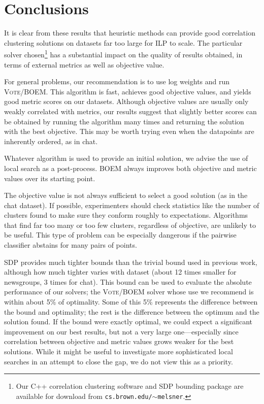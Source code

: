 \documentclass[11pt]{article}
\newcommand{\cut}[1]{}
\newcommand{\alg}[1]{\textsc{#1}}
\begin{document}
\section{Conclusions}

It is clear from these results that heuristic methods can provide good
correlation clustering solutions on datasets far too large for ILP to
scale. The particular solver chosen\footnote{Our C++ correlation
  clustering software and SDP bounding package are available for
  download from \texttt{cs.brown.edu/$\sim$melsner}.} has a
substantial impact on the quality of results obtained, in terms of
external metrics as well as objective value.

For general problems, our recommendation is to use log weights and run
\alg{Vote}/\alg{BOEM}. This algorithm is fast, achieves good objective values,
and yields good metric scores on our datasets. Although objective
values are usually only weakly correlated with metrics, our results
suggest that slightly better scores can be obtained by running the
algorithm many times and returning the solution with the best
objective. This may be worth trying even when the datapoints
are inherently ordered, as in chat.

Whatever algorithm is used to provide an initial solution, we advise
the use of local search as a post-process. \alg{BOEM} always improves both
objective and metric values over its starting point.

The objective value is not always sufficient to select a good solution
(as in the chat dataset). If possible, experimenters should check
statistics like the number of clusters found to make sure they conform
roughly to expectations. Algorithms that find far too many or too few
clusters, regardless of objective, are unlikely to be useful. This
type of problem can be especially dangerous if the pairwise classifier
abstains for many pairs of points.

SDP provides much tighter bounds than the trivial bound used in
previous work, although how much tighter varies with dataset (about 12
times smaller \cut{gap} for newsgroups, 3 times \cut{smaller gap} for
chat). This bound can be used to evaluate the absolute performance of
our solvers; the \alg{Vote}/\alg{BOEM} solver whose use we recommend
is within about 5\% of optimality. Some of this 5\% represents the
difference between the bound and optimality; the rest is the
difference between the optimum and the solution found. If the
bound were exactly optimal\cut{ the entire 5\% were achievable
  (\cut{that is,}the SDP bound \cut{value} was optimal \cut{were
    identical to optimum})}, we could expect a significant improvement
on our best results, but not a very large one---especially since
correlation between objective and metric values grows weaker for the
best solutions. While it might be useful to investigate more
sophisticated local searches in an attempt to close the gap, we do not
view this as a priority.
\end{document}
